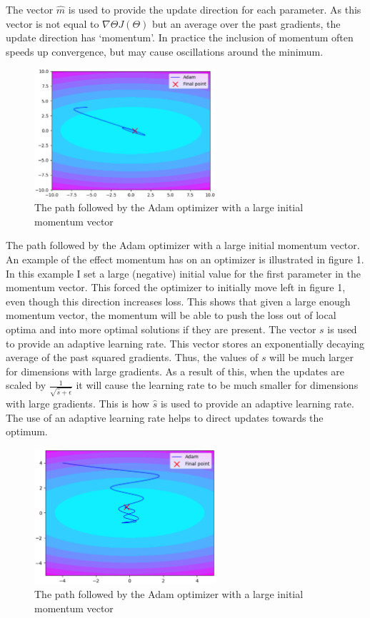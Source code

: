 The vector $\hat{m}$ is used to provide the update direction for each parameter.
As this vector is not equal to $\nabla \Theta J(\Theta)$ but an average over the past gradients,
the update direction has ‘momentum’. In practice the inclusion of momentum often speeds up 
convergence, but may cause oscillations around the minimum. 
\begin{figure}[htb] 
	\label{fig:adam_starting_momentum}
	\centering
	\includegraphics[width=0.6\textwidth]{figures/adam_starting_momentum}
	\caption{The path followed by the Adam optimizer with a large initial momentum vector}
\end{figure}
The path followed by the Adam optimizer with a large initial momentum vector.
An example of the effect momentum has on an optimizer is illustrated in figure 1. 
In this example I set a large (negative) initial value for the first parameter in 
the momentum vector.
This forced the optimizer to initially move left in figure 1, even though this direction 
increases loss. 
This shows that given a large enough momentum vector, the momentum will be able to push the loss
out of local optima and into more optimal solutions if they are present.
The vector $s$ is used to provide an adaptive learning rate. 
This vector stores an exponentially decaying average of the past squared gradients.
Thus, the values of $s$ will be much larger for dimensions with large gradients. 
As a result of this, when the updates are scaled by $\frac{1}{\sqrt{\hat{s}+\epsilon}}$ it will
cause the learning rate to be much smaller for dimensions with large gradients.
This is how $\hat{s}$ is used to provide an adaptive learning rate. 
The use of an adaptive learning rate helps to direct updates towards the optimum.
\begin{figure}[htb] 
	\label{fig:adam}
	\centering
	\includegraphics[width=0.6\textwidth]{figures/adam}
	\caption{The path followed by the Adam optimizer with a large initial momentum vector}
\end{figure}


